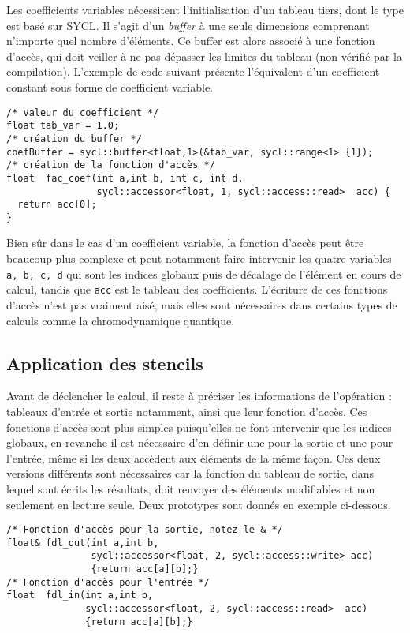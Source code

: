 Les coefficients variables nécessitent l'initialisation d'un tableau tiers, dont le type est basé sur \textsf{SYCL}. Il s'agit d'un \emph{buffer} à une seule dimensions comprenant n'importe quel nombre d'éléments. Ce buffer est alors associé à une fonction d'accès, qui doit veiller à ne pas dépasser les limites du tableau (non vérifié par la compilation). L'exemple de code suivant présente l'équivalent d'un coefficient constant sous forme de coefficient variable.
\begin{verbatim}
/* valeur du coefficient */
float tab_var = 1.0;
/* création du buffer */
coefBuffer = sycl::buffer<float,1>(&tab_var, sycl::range<1> {1});
/* création de la fonction d'accès */
float  fac_coef(int a,int b, int c, int d, 
                sycl::accessor<float, 1, sycl::access::read>  acc) {
  return acc[0];
}
\end{verbatim}
Bien sûr dans le cas d'un coefficient variable, la fonction d'accès peut être beaucoup plus complexe et peut notamment faire intervenir les quatre variables \verb!a, b, c, d! qui sont les indices globaux puis de décalage de l'élément en cours de calcul, tandis que \verb!acc! est le tableau des coefficients. L'écriture de ces fonctions d'accès n'est pas vraiment aisé, mais elles sont nécessaires dans certains types de calculs comme la chromodynamique quantique.

\subsection{Application des stencils}

Avant de déclencher le calcul, il reste à préciser les informations de l'opération : tableaux d'entrée et sortie notamment, ainsi que leur fonction d'accès. Ces fonctions d'accès sont plus simples puisqu'elles ne font intervenir que les indices globaux, en revanche il est nécessaire d'en définir une pour la sortie et une pour l'entrée, même si les deux accèdent aux éléments de la même façon. Ces deux versions différents sont nécessaires car la fonction du tableau de sortie, dans lequel sont écrits les résultats, doit renvoyer des éléments modifiables et non seulement en lecture seule. Deux prototypes sont donnés en exemple ci-dessous.
\begin{verbatim}
/* Fonction d'accès pour la sortie, notez le & */
float& fdl_out(int a,int b, 
               sycl::accessor<float, 2, sycl::access::write> acc) 
               {return acc[a][b];}
/* Fonction d'accès pour l'entrée */
float  fdl_in(int a,int b, 
              sycl::accessor<float, 2, sycl::access::read>  acc) 
              {return acc[a][b];}
\end{verbatim}

